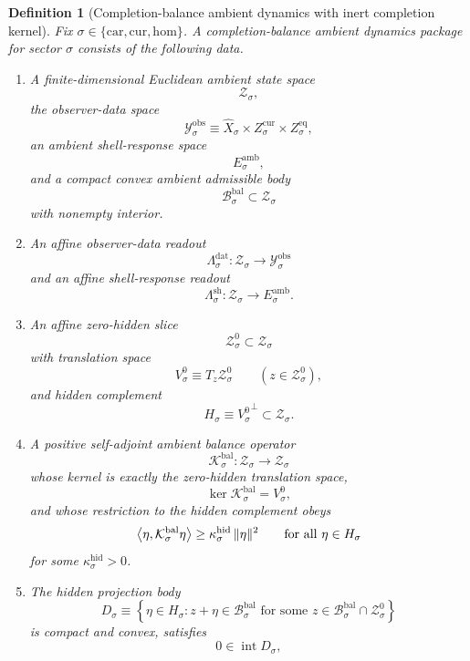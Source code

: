 \documentclass[11pt]{article}
\newcommand{\Car}{\mathrm{car}}
\newcommand{\Cur}{\mathrm{cur}}
\newcommand{\Hom}{\mathrm{hom}}
\newcommand{\VisibleAffine}[1]{\widehat X_{#1}}
\newcommand{\DataSpace}[1]{\mathcal Y_{#1}^{\mathrm{obs}}}
\newcommand{\AmbientTarget}[1]{E_{#1}^{\mathrm{amb}}}
\newcommand{\BalSpace}[1]{\mathcal Z_{#1}}
\newcommand{\BalBody}[1]{\mathcal B_{#1}^{\mathrm{bal}}}
\newcommand{\BalData}[1]{\Lambda_{#1}^{\mathrm{dat}}}
\newcommand{\BalShell}[1]{\Lambda_{#1}^{\mathrm{sh}}}
\newcommand{\ZeroHiddenSlice}[1]{\mathcal Z_{#1}^{0}}
\newcommand{\ZeroHiddenVec}[1]{V_{#1}^{0}}
\newcommand{\BalOp}[1]{\mathcal K_{#1}^{\mathrm{bal}}}
\newcommand{\GapSpace}[1]{H_{#1}}
\newcommand{\GapBody}[1]{D_{#1}}
\newtheorem{definition}{Definition}
\begin{document}
\begin{definition}[Completion-balance ambient dynamics with inert completion kernel]
\label{def:ambient}
Fix \(\sigma\in\{\Car,\Cur,\Hom\}\). A \emph{completion-balance ambient dynamics package} for sector \(\sigma\) consists of the following data.
\begin{enumerate}
    \item A finite-dimensional Euclidean ambient state space
    \[
    \BalSpace{\sigma},
    \]
    the observer-data space
    \[
    \DataSpace{\sigma}
    \equiv
    \VisibleAffine{\sigma}\times Z_{\sigma}^{\mathrm{cur}}\times Z_{\sigma}^{\mathrm{eq}},
    \]
    an ambient shell-response space
    \[
    \AmbientTarget{\sigma},
    \]
    and a compact convex ambient admissible body
    \[
    \BalBody{\sigma}\subset\BalSpace{\sigma}
    \]
    with nonempty interior.
    \item An affine observer-data readout
    \[
    \BalData{\sigma}:\BalSpace{\sigma}\to\DataSpace{\sigma}
    \]
    and an affine shell-response readout
    \[
    \BalShell{\sigma}:\BalSpace{\sigma}\to\AmbientTarget{\sigma}.
    \]
    \item An affine zero-hidden slice
    \[
    \ZeroHiddenSlice{\sigma}\subset\BalSpace{\sigma}
    \]
    with translation space
    \[
    \ZeroHiddenVec{\sigma}\equiv T_{z}\ZeroHiddenSlice{\sigma}
    \qquad
    (z\in\ZeroHiddenSlice{\sigma}),
    \]
    and hidden complement
    \[
    \GapSpace{\sigma}
    \equiv
    {\ZeroHiddenVec{\sigma}}^{\perp}\subset\BalSpace{\sigma}.
    \]
    \item A positive self-adjoint ambient balance operator
    \[
    \BalOp{\sigma}:\BalSpace{\sigma}\to\BalSpace{\sigma}
    \]
    whose kernel is exactly the zero-hidden translation space,
    \[
    \ker \BalOp{\sigma}=\ZeroHiddenVec{\sigma},
    \]
    and whose restriction to the hidden complement obeys
    \begin{equation}
    \ev{\eta,\BalOp{\sigma}\eta}
    \ge
    \kappa_{\sigma}^{\mathrm{hid}}\,
    \|\eta\|^{2}
    \qquad
    \text{for all }\eta\in\GapSpace{\sigma}
    \label{eq:ambientgap}
    \end{equation}
    for some \(\kappa_{\sigma}^{\mathrm{hid}}>0\).
    \item The hidden projection body
    \[
    \GapBody{\sigma}
    \equiv
    \left\{
    \eta\in\GapSpace{\sigma}:
    z+\eta\in\BalBody{\sigma}
    \text{ for some }z\in \BalBody{\sigma}\cap\ZeroHiddenSlice{\sigma}
    \right\}
    \]
    is compact and convex, satisfies
    \[
    0\in\operatorname{int}\GapBody{\sigma},
\]
\end{enumerate}
\end{definition}
\end{document}
